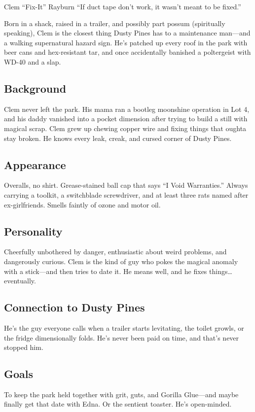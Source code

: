 \newpage
\begin{WyrdCharacterSheet}
    {Clem “Fix-It” Rayburn}
    {“If duct tape don’t work, it wasn’t meant to be fixed.”}
    \label{pc:clem-rayburn}

    Born in a shack, raised in a trailer, and possibly part possum (spiritually speaking), Clem is the closest thing Dusty Pines has to a maintenance man—and a walking supernatural hazard sign. He’s patched up every roof in the park with beer cans and hex-resistant tar, and once accidentally banished a poltergeist with WD-40 and a slap.

    \subsection{Background}
    Clem never left the park. His mama ran a bootleg moonshine operation in Lot 4, and his daddy vanished into a pocket dimension after trying to build a still with magical scrap. Clem grew up chewing copper wire and fixing things that oughta stay broken. He knows every leak, creak, and cursed corner of Dusty Pines.

    \subsection{Appearance}
    Overalls, no shirt. Grease-stained ball cap that says “I Void Warranties.” Always carrying a toolkit, a switchblade screwdriver, and at least three rats named after ex-girlfriends. Smells faintly of ozone and motor oil.

    \subsection{Personality}
    Cheerfully unbothered by danger, enthusiastic about weird problems, and dangerously curious. Clem is the kind of guy who pokes the magical anomaly with a stick—and then tries to date it. He means well, and he fixes things… eventually.

    \subsection{Connection to Dusty Pines}
    He’s the guy everyone calls when a trailer starts levitating, the toilet growls, or the fridge dimensionally folds. He’s never been paid on time, and that’s never stopped him.

    \subsection{Goals}
    To keep the park held together with grit, guts, and Gorilla Glue—and maybe finally get that date with Edna. Or the sentient toaster. He’s open-minded.


\end{WyrdCharacterSheet}
